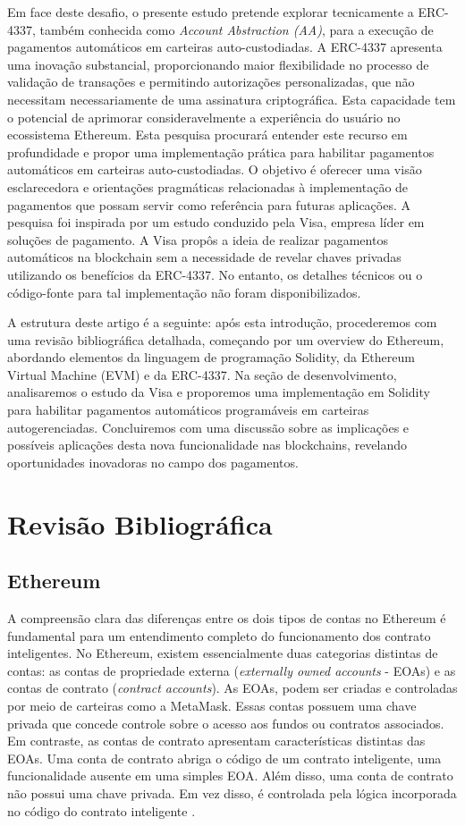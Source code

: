 \documentclass[12pt]{article}
\begin{document}
Em face deste desafio, o presente estudo pretende explorar tecnicamente a ERC-4337\cite{5}, também
conhecida como \textit{Account Abstraction (AA)}, para a execução de pagamentos automáticos em
carteiras auto-custodiadas. A ERC-4337 apresenta uma inovação substancial, proporcionando maior
flexibilidade no processo de validação de transações e permitindo autorizações personalizadas, que
não necessitam necessariamente de uma assinatura criptográfica. Esta capacidade tem o potencial de
aprimorar consideravelmente a experiência do usuário no ecossistema Ethereum\cite{12}. Esta
pesquisa procurará entender este recurso em profundidade e propor uma implementação prática para
habilitar pagamentos automáticos em carteiras auto-custodiadas. O objetivo é oferecer uma visão
esclarecedora e orientações pragmáticas relacionadas à implementação de pagamentos que possam
servir como referência para futuras aplicações. A pesquisa foi inspirada por um estudo conduzido
pela Visa, empresa líder em soluções de pagamento. A Visa propôs a ideia de realizar pagamentos
automáticos na blockchain sem a necessidade de revelar chaves privadas utilizando os benefícios da
ERC-4337\cite{9}. No entanto, os detalhes técnicos ou o código-fonte para tal implementação não
foram disponibilizados.

A estrutura deste artigo é a seguinte: após esta introdução, procederemos com uma revisão
bibliográfica detalhada, começando por um overview do Ethereum, abordando elementos da linguagem de
programação Solidity, da Ethereum Virtual Machine (EVM) e da ERC-4337. Na seção de desenvolvimento,
analisaremos o estudo da Visa e proporemos uma implementação em Solidity para habilitar pagamentos
automáticos programáveis em carteiras autogerenciadas. Concluiremos com uma discussão sobre as
implicações e possíveis aplicações desta nova funcionalidade nas blockchains, revelando
oportunidades inovadoras no campo dos pagamentos.

\section{Revisão Bibliográfica}\label{sec:revisao}

\subsection{Ethereum}
A compreensão clara das diferenças entre os dois tipos de contas no Ethereum é fundamental para um
entendimento completo do funcionamento dos contrato inteligentes. No Ethereum, existem
essencialmente duas categorias distintas de contas: as contas de propriedade externa
(\textit{externally owned accounts} - EOAs) e as contas de contrato (\textit{contract accounts}).
As EOAs, podem ser criadas e controladas por meio de carteiras como a MetaMask. Essas contas
possuem uma chave privada que concede controle sobre o acesso aos fundos ou contratos associados.
Em contraste, as contas de contrato apresentam características distintas das EOAs. Uma conta de
contrato abriga o código de um contrato inteligente, uma funcionalidade ausente em uma simples EOA.
Além disso, uma conta de contrato não possui uma chave privada. Em vez disso, é controlada pela
lógica incorporada no código do contrato inteligente \cite{6}.
\end{document}
